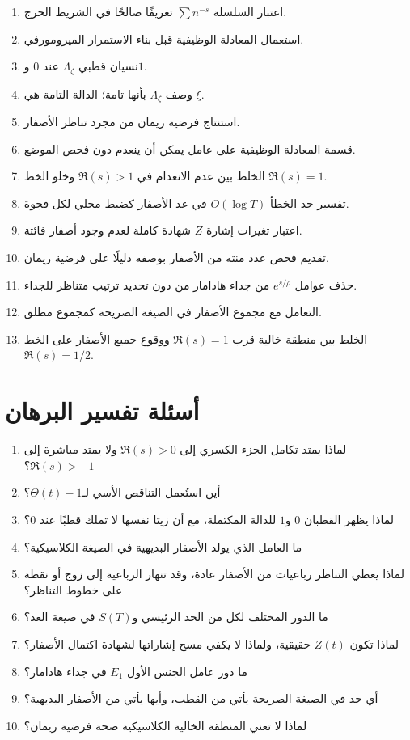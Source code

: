 \begin{enumerate}
  \item اعتبار السلسلة \(\sum n^{-s}\) تعريفًا صالحًا في الشريط الحرج.
  \item استعمال المعادلة الوظيفية قبل بناء الاستمرار الميرومورفي.
  \item نسيان قطبي \(\Lambda_\zeta\) عند \(0\) و\(1\).
  \item وصف \(\Lambda_\zeta\) بأنها تامة؛ الدالة التامة هي \(\xi\).
  \item استنتاج فرضية ريمان من مجرد تناظر الأصفار.
  \item قسمة المعادلة الوظيفية على عامل يمكن أن ينعدم دون فحص الموضع.
  \item الخلط بين عدم الانعدام في \(\Re(s)>1\) وخلو الخط
  \(\Re(s)=1\).
  \item تفسير حد الخطأ \(O(\log T)\) في عد الأصفار كضبط محلي لكل فجوة.
  \item اعتبار تغيرات إشارة \(Z\) شهادة كاملة لعدم وجود أصفار فائتة.
  \item تقديم فحص عدد منته من الأصفار بوصفه دليلًا على فرضية ريمان.
  \item حذف عوامل \(e^{s/\rho}\) من جداء هادامار من دون تحديد ترتيب
  متناظر للجداء.
  \item التعامل مع مجموع الأصفار في الصيغة الصريحة كمجموع مطلق.
  \item الخلط بين منطقة خالية قرب \(\Re(s)=1\) ووقوع جميع الأصفار على
  الخط \(\Re(s)=1/2\).
\end{enumerate}

\section{أسئلة تفسير البرهان}

\begin{enumerate}
  \item لماذا يمتد تكامل الجزء الكسري إلى \(\Re(s)>0\) ولا يمتد
  مباشرة إلى \(\Re(s)>-1\)؟
  \item أين استُعمل التناقص الأسي لـ\(\Theta(t)-1\)؟
  \item لماذا يظهر القطبان \(0\) و\(1\) للدالة المكتملة، مع أن زيتا
  نفسها لا تملك قطبًا عند \(0\)؟
  \item ما العامل الذي يولد الأصفار البديهية في الصيغة الكلاسيكية؟
  \item لماذا يعطي التناظر رباعيات من الأصفار عادة، وقد تنهار الرباعية
  إلى زوج أو نقطة على خطوط التناظر؟
  \item ما الدور المختلف لكل من الحد الرئيسي و\(S(T)\) في صيغة العد؟
  \item لماذا تكون \(Z(t)\) حقيقية، ولماذا لا يكفي مسح إشاراتها لشهادة
  اكتمال الأصفار؟
  \item ما دور عامل الجنس الأول \(E_1\) في جداء هادامار؟
  \item أي حد في الصيغة الصريحة يأتي من القطب، وأيها يأتي من الأصفار
  البديهية؟
  \item لماذا لا تعني المنطقة الخالية الكلاسيكية صحة فرضية ريمان؟
\end{enumerate}

